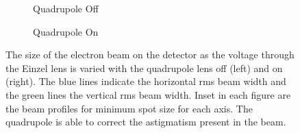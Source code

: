 \begin{figure}
    \centering
    \begin{subfigure}{0.49\linewidth}
    \centering
    
    \caption{Quadrupole Off}
    \label{figure:quadrupole_scans_off}
    \end{subfigure}
    \begin{subfigure}{0.49\linewidth}
    \centering
    
    \caption{Quadrupole On}
    \label{figure:quadrupole_scans_on}
    \end{subfigure}
    \caption[Astigmatism correction.]{The size of the electron beam on the detector as the voltage through the Einzel lens is varied with the quadrupole lens off (left) and on (right). The blue lines indicate the horizontal \gls{rms} beam width and the green lines the vertical \gls{rms} beam width. Inset in each figure are the beam profiles for minimum spot size for each axis. The quadrupole is able to correct the astigmatism present in the beam.}
    \label{figure:quadrupole_scans}
\end{figure}
